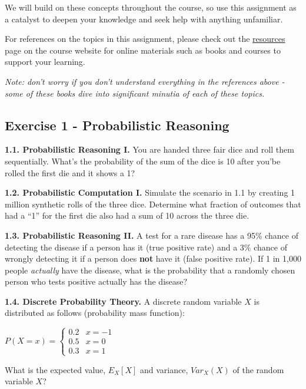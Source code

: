 \documentclass[
  letterpaper,
  DIV=11,
  numbers=noendperiod]{scrartcl}
\begin{document}
We will build on these concepts throughout the course, so use this
assignment as a catalyst to deepen your knowledge and seek help with
anything unfamiliar.

For references on the topics in this assignment, please check out the
\href{../resources.qmd\#}{resources} page on the course website for
online materials such as books and courses to support your learning.

\emph{Note: don't worry if you don't understand everything in the
references above - some of these books dive into significant minutia of
each of these topics.}

\newpage{}

\subsection{Exercise 1 - Probabilistic
Reasoning}\label{exercise-1---probabilistic-reasoning}

\textbf{1.1. Probabilistic Reasoning I.} You are handed three fair dice
and roll them sequentially. What's the probability of the sum of the
dice is 10 after you'be rolled the first die and it shows a 1?

\textbf{1.2. Probabilistic Computation I.} Simulate the scenario in 1.1
by creating 1 million synthetic rolls of the three dice. Determine what
fraction of outcomes that had a ``1'' for the first die also had a sum
of 10 across the three die.

\textbf{1.3. Probabilistic Reasoning II.} A test for a rare disease has
a 95\% chance of detecting the disease if a person has it (true positive
rate) and a 3\% chance of wrongly detecting it if a person does
\textbf{not} have it (false positive rate). If 1 in 1,000 people
\emph{actually} have the disease, what is the probability that a
randomly chosen person who tests positive actually has the disease?

\textbf{1.4. Discrete Probability Theory.} A discrete random variable
\(X\) is distributed as follows (probability mass function):

\(P(X = x) = \begin{cases}
                0.2 & x = -1 \\
                0.5 & x = 0 \\
                0.3 & x = 1
            \end{cases}\)

What is the expected value, \(E_X[X]\) and variance, \(Var_X(X)\) of the
random variable \(X\)?
\end{document}
